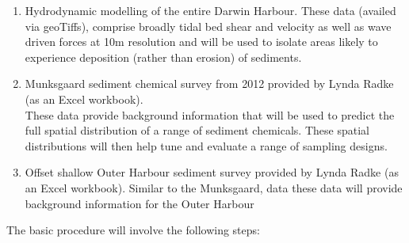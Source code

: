 \documentclass[a4paper]{article}
\begin{document}
\begin{enumerate}
\def\labelenumi{\arabic{enumi}.}
\item
  Hydrodynamic modelling of the entire Darwin Harbour. These data
  (availed via geoTiffs), comprise broadly tidal bed shear and velocity
  as well as wave driven forces at 10m resolution and will be used to
  isolate areas likely to experience deposition (rather than erosion) of
  sediments.
\item
  Munksgaard sediment chemical survey from 2012 provided by Lynda Radke
  (as an Excel workbook).\\
  These data provide background information that will be used to predict
  the full spatial distribution of a range of sediment chemicals. These
  spatial distributions will then help tune and evaluate a range of
  sampling designs.
\item
  Offset shallow Outer Harbour sediment survey provided by Lynda Radke
  (as an Excel workbook). Similar to the Munksgaard, data these data
  will provide background information for the Outer Harbour
\end{enumerate}

The basic procedure will involve the following steps:
\end{document}
